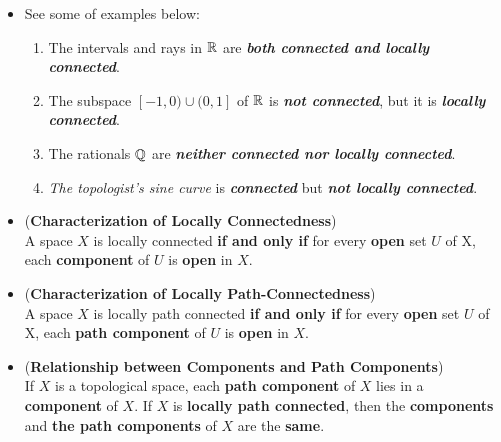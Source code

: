 \documentclass[11pt]{article}
\begin{document}
\begin{itemize}
\item \begin{example}
See some of examples below:
\begin{enumerate}
\item The intervals and rays in ${\mathbb R}$ are \emph{\textbf{both connected and locally connected}}.
\item The subspace $[−1, 0) \cup (0, 1]$ of ${\mathbb R}$ is \emph{\textbf{not connected}}, but it is \emph{\textbf{locally connected}}.
\item The rationals ${\mathbb Q}$ are \emph{\textbf{neither connected nor locally connected}}.
\item \emph{The topologist’s sine curve} is \emph{\textbf{connected}} but \emph{\textbf{not locally connected}}.
\end{enumerate} 
\end{example}


\item \begin{proposition} (\textbf{Characterization of Locally Connectedness}) \citep{munkres2000topology}\\
A space $X$ is locally connected \textbf{if and only if} for every \textbf{open} set $U$ of X, each \textbf{component} of $U$ is \textbf{open} in $X$.
\end{proposition}

\item \begin{proposition} (\textbf{Characterization of Locally Path-Connectedness}) \citep{munkres2000topology}\\
A space $X$ is locally path connected \textbf{if and only if} for every \textbf{open} set $U$ of X, each \textbf{path component} of $U$ is \textbf{open} in $X$.
\end{proposition}

\item \begin{proposition} (\textbf{Relationship between Components and Path Components})\\
If $X$ is a topological space, each \textbf{path component} of $X$ lies in a \textbf{component} of $X$. If $X$ is \textbf{locally path connected}, then the \textbf{components} and \textbf{the path components} of $X$ are the \textbf{same}.
\end{proposition}
\end{itemize}
\end{document}
